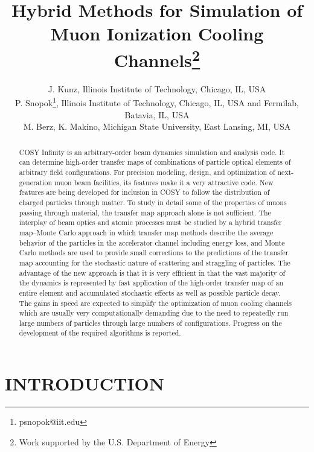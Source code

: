 \documentclass{jacow}
\begin{document}
\title{Hybrid Methods for Simulation of Muon Ionization Cooling Channels\thanks{Work supported by the U.S. Department of Energy}}

\author{J. Kunz, Illinois Institute of Technology, Chicago, IL, USA \\
P. Snopok\thanks{psnopok@iit.edu}, Illinois Institute of Technology, Chicago, IL, USA and Fermilab, Batavia, IL, USA \\
M. Berz, K. Makino, Michigan State University, East Lansing, MI, USA}

\maketitle

\begin{abstract}
COSY Infinity is an arbitrary-order beam dynamics simulation and analysis code. It can determine high-order transfer maps of combinations of particle optical elements of arbitrary field configurations. For precision modeling, design, and optimization of next-generation muon beam facilities, its features make it a very attractive code. New features are being developed for inclusion in COSY to follow the distribution of charged particles through matter. To study in detail some of the properties of muons passing through material, the transfer map approach alone is not sufficient. The interplay of beam optics and atomic processes must be studied by a hybrid transfer map--Monte Carlo approach in which transfer map methods describe the average behavior of the particles in the accelerator channel including energy loss, and Monte Carlo methods are used to provide small corrections to the predictions of the transfer map accounting for the stochastic nature of scattering and straggling of particles. The advantage of the new approach is that it is very efficient in that the vast majority of the dynamics is represented by fast application of the high-order transfer map of an entire element and accumulated stochastic effects as well as possible particle decay. The gains in speed are expected to simplify the optimization of muon cooling channels which are usually very computationally demanding due to the need to repeatedly run large numbers of particles through large numbers of configurations. Progress on the development of the required algorithms is reported.
\end{abstract}

\section{INTRODUCTION}
\end{document}
